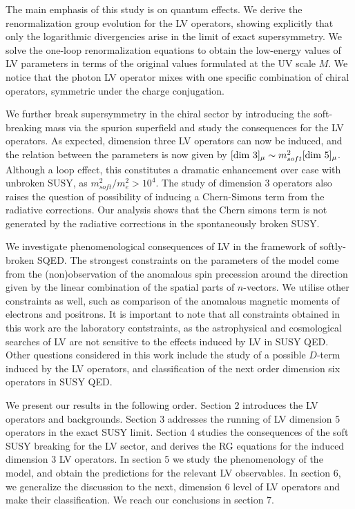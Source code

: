 \documentclass[paper,12pt]{revtex4}
\begin{document}
The main emphasis of this study is on quantum effects. We derive the renormalization 
group evolution for the LV operators, showing explicitly that only the logarithmic divergencies 
arise in the limit of exact supersymmetry. We solve the one-loop renormalization equations
to obtain the low-energy values of LV parameters in terms of the original values formulated at the 
UV scale $M$. We notice that the photon LV operator mixes with one specific combination of 
chiral operators, symmetric under the charge conjugation. 

We further break supersymmetry in the chiral sector by introducing the 
soft-breaking mass via the spurion superfield and study the consequences for the 
LV operators. As expected, dimension three LV operators can now be induced, and the 
relation between the parameters is now given by $[{\rm dim}~3]_{\mu} 
\sim m_{soft}^2 [{\rm dim}~5]_{\mu}$. Although a loop effect, this constitutes 
a dramatic enhancement over case with unbroken SUSY, as $ m_{soft}^2/m_e^2 > 10^4$. 
The study of dimension 3 operators also raises the question of possibility of 
inducing  a Chern-Simons term from the radiative corrections.
Our analysis shows that the Chern simons term is not generated by the 
radiative corrections in the spontaneously broken SUSY.

We investigate phenomenological consequences of LV in the framework of softly-broken 
SQED. The strongest constraints on the parameters of the model come from the 
(non)observation of the anomalous spin precession around the direction given by the 
linear combination of the spatial parts of $n$-vectors. We utilise other constraints as well, 
such as comparison of the anomalous magnetic moments of electrons and 
positrons. It is important to note that all constraints obtained in this 
work are the laboratory contstraints, as the astrophysical and cosmological 
searches of LV are not sensitive to the effects induced by LV in SUSY QED. 
Other questions considered in this work include the study of a possible $D$-term 
induced by the LV operators, and classification of the next order
dimension six operators in SUSY QED. 

We present our results in the following order. Section 2 introduces the LV operators
and backgrounds. Section 3 addresses the running of LV dimension 5 operators in the 
exact SUSY limit. Section 4 studies the consequences of the soft SUSY breaking 
for the LV sector, and derives the RG equations for the induced dimension 3 LV operators. 
In section 5 we study the phenomenology of the model, and obtain the predictions 
for the relevant LV observables. In section 6, we generalize the discussion to the next, dimension 6 
level of LV operators and make their classification. We reach our conclusions in section 7. 
\end{document}
